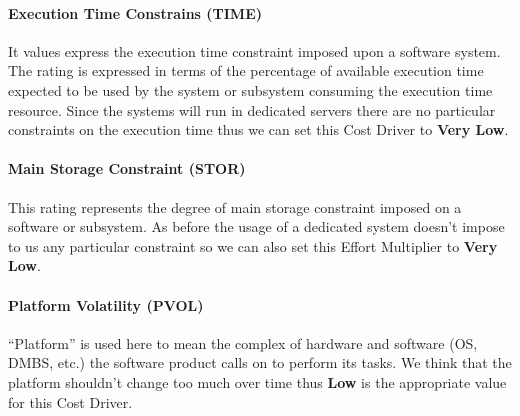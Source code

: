 
\paragraph{Execution Time Constrains (TIME)} It values express the execution time constraint imposed upon a software system. The rating is expressed in terms of the percentage of available execution time expected to be used by the system or subsystem consuming the execution time resource. Since the systems will run in dedicated servers there are no particular constraints on the execution time thus we can set this Cost Driver to \textbf{Very Low}.


\paragraph{Main Storage Constraint (STOR)} This rating represents the degree of main storage constraint imposed on a software or subsystem. As before the usage of a dedicated system doesn't impose to us any particular constraint so we can also set this Effort Multiplier to \textbf{Very Low}.


\paragraph{Platform Volatility (PVOL)} ``Platform'' is used here to mean the complex of hardware and software (OS, DMBS, etc.) the software product calls on to perform its tasks. We think that the platform shouldn't change too much over time thus \textbf{Low} is the appropriate value for this Cost Driver. 

